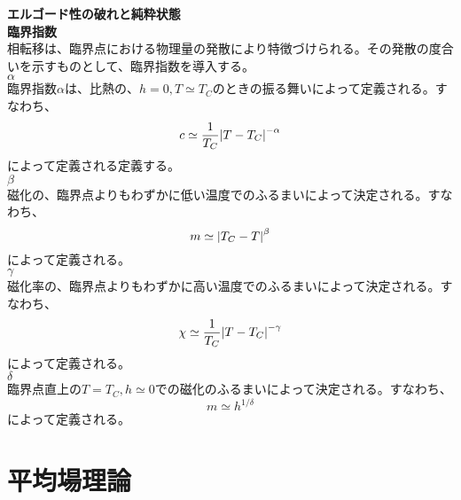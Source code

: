 \documentclass[a4paper,11pt]{jsarticle}
\numberwithin{equation}{section}
\begin{document}
\textbf{エルゴード性の破れと純粋状態}\\

\textbf{臨界指数}\\
相転移は、臨界点における物理量の発散により特徴づけられる。その発散の度合いを示すものとして、臨界指数を導入する。\\
\textbf{$\alpha$}\\
臨界指数$\alpha$は、比熱の、$h=0,T\simeq T_C$のときの振る舞いによって定義される。すなわち、
\begin{equation}
    c \simeq \frac{1}{T_C}\abs{T-T_C}^{-\alpha}
\end{equation}
によって定義される定義する。\\

\textbf{$\beta$}\\
磁化の、臨界点よりもわずかに低い温度でのふるまいによって決定される。すなわち、
\begin{equation}
    m \simeq \abs{T_C - T}^{\beta}
\end{equation}
によって定義される。\\

\textbf{$\gamma$}\\
磁化率の、臨界点よりもわずかに高い温度でのふるまいによって決定される。すなわち、
\begin{equation}
    \chi \simeq \frac{1}{T_C}\abs{T-T_C}^{-\gamma}
\end{equation}
によって定義される。\\

\textbf{$\delta$}\\
臨界点直上の$T=T_C,h \simeq 0$での磁化のふるまいによって決定される。すなわち、
\begin{equation}
    m \simeq h^{1/\delta}
\end{equation}
によって定義される。\\


\section{平均場理論}
\end{document}
